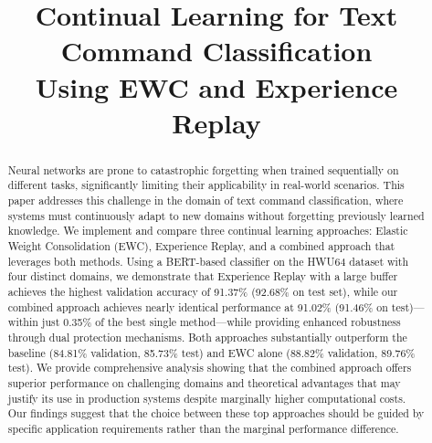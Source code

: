 \documentclass[conference]{IEEEtran}
\begin{document}
\title{Continual Learning for Text Command Classification\\Using EWC and Experience Replay}

\author{
\and
{}
}

\maketitle

\begin{abstract}
Neural networks are prone to catastrophic forgetting when trained sequentially on different tasks, significantly limiting their applicability in real-world scenarios. This paper addresses this challenge in the domain of text command classification, where systems must continuously adapt to new domains without forgetting previously learned knowledge. We implement and compare three continual learning approaches: Elastic Weight Consolidation (EWC), Experience Replay, and a combined approach that leverages both methods. Using a BERT-based classifier on the HWU64 dataset with four distinct domains, we demonstrate that Experience Replay with a large buffer achieves the highest validation accuracy of 91.37\% (92.68\% on test set), while our combined approach achieves nearly identical performance at 91.02\% (91.46\% on test)—within just 0.35\% of the best single method—while providing enhanced robustness through dual protection mechanisms. Both approaches substantially outperform the baseline (84.81\% validation, 85.73\% test) and EWC alone (88.82\% validation, 89.76\% test). We provide comprehensive analysis showing that the combined approach offers superior performance on challenging domains and theoretical advantages that may justify its use in production systems despite marginally higher computational costs. Our findings suggest that the choice between these top approaches should be guided by specific application requirements rather than the marginal performance difference.
\end{abstract}
\end{document}

